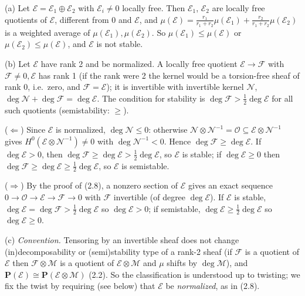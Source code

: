 \documentclass[11pt]{article}
\begin{document}
(a) Let $\mathcal E=\mathcal E_1\oplus\mathcal E_2$ with $\mathcal E_i\ne0$ locally free. Then $\mathcal E_1$, $\mathcal E_2$ are locally free quotients of $\mathcal E$, different from $0$ and $\mathcal E$, and $\mu(\mathcal E)=\frac{r_1}{r_1+r_2}\mu(\mathcal E_1)+\frac{r_2}{r_1+r_2}\mu(\mathcal E_2)$ is a weighted average of $\mu(\mathcal E_1),\mu(\mathcal E_2)$. So $\mu(\mathcal E_1)\le\mu(\mathcal E)$ or $\mu(\mathcal E_2)\le\mu(\mathcal E)$, and $\mathcal E$ is not stable.

(b) Let $\mathcal E$ have rank 2 and be normalized. A locally free quotient $\mathcal E\to\mathcal F$ with $\mathcal F\ne0,\mathcal E$ has rank 1 (if the rank were 2 the kernel would be a torsion-free sheaf of rank 0, i.e.\ zero, and $\mathcal F=\mathcal E$); it is invertible with invertible kernel $\mathcal N$, $\deg\mathcal N+\deg\mathcal F=\deg\mathcal E$. The condition for stability is $\deg\mathcal F>\frac12\deg\mathcal E$ for all such quotients (semistability: $\ge$).

($\Leftarrow$) Since $\mathcal E$ is normalized, $\deg\mathcal N\le0$: otherwise $\mathcal N\otimes\mathcal N^{-1}=\mathcal O\subseteq\mathcal E\otimes\mathcal N^{-1}$ gives $H^0(\mathcal E\otimes\mathcal N^{-1})\ne0$ with $\deg\mathcal N^{-1}<0$. Hence $\deg\mathcal F\ge\deg\mathcal E$. If $\deg\mathcal E>0$, then $\deg\mathcal F\ge\deg\mathcal E>\frac12\deg\mathcal E$, so $\mathcal E$ is stable; if $\deg\mathcal E\ge0$ then $\deg\mathcal F\ge\deg\mathcal E\ge\frac12\deg\mathcal E$, so $\mathcal E$ is semistable.

($\Rightarrow$) By the proof of (2.8), a nonzero section of $\mathcal E$ gives an exact sequence $0\to\mathcal O\to\mathcal E\to\mathcal F\to0$ with $\mathcal F$ invertible (of degree $\deg\mathcal E$). If $\mathcal E$ is stable, $\deg\mathcal E=\deg\mathcal F>\frac12\deg\mathcal E$ so $\deg\mathcal E>0$; if semistable, $\deg\mathcal E\ge\frac12\deg\mathcal E$ so $\deg\mathcal E\ge0$.

(c) \emph{Convention.} Tensoring by an invertible sheaf does not change (in)decomposability or (semi)stability type of a rank-2 sheaf (if $\mathcal F$ is a quotient of $\mathcal E$ then $\mathcal F\otimes\mathcal M$ is a quotient of $\mathcal E\otimes\mathcal M$ and $\mu$ shifts by $\deg\mathcal M$), and $\mathbf P(\mathcal E)\cong\mathbf P(\mathcal E\otimes\mathcal M)$ (2.2). So the classification is understood up to twisting; we fix the twist by requiring (see below) that $\mathcal E$ be \emph{normalized}, as in (2.8).
\end{document}
